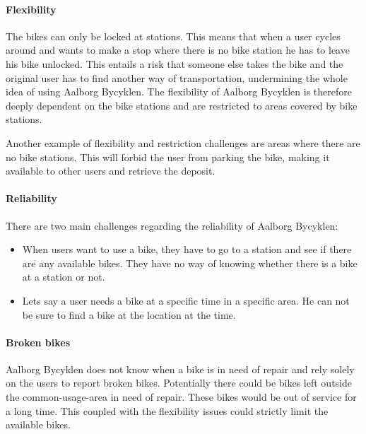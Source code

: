 \paragraph{Flexibility}
The bikes can only be locked at stations.
This means that when a user cycles around and wants to make a stop where there is no bike station he has to leave his bike unlocked.
This entails a risk that someone else takes the bike and the original user has to find another way of transportation, undermining the whole idea of using Aalborg Bycyklen.
The flexibility of Aalborg Bycyklen is therefore deeply dependent on the bike stations and are restricted to areas covered by bike stations.

Another example of flexibility and restriction challenges are areas where there are no bike stations. This will forbid the user from parking the bike, making it available to other users and retrieve the deposit.

\paragraph{Reliability}
There are two main challenges regarding the reliability of Aalborg Bycyklen:
\begin{itemize}
\item When users want to use a bike, they have to go to a station and see if there are any available bikes.
They have no way of knowing whether there is a bike at a station or not.
\item Lets say a user needs a bike at a specific time in a specific area.
He can not be sure to find a bike at the location at the time.
\end{itemize}

\paragraph{Broken bikes}
Aalborg Bycyklen does not know when a bike is in need of repair and rely solely on the users to report broken bikes.
Potentially there could be bikes left outside the common-usage-area in need of repair. These bikes would be out of service for a long time.
This coupled with the flexibility issues could strictly limit the available bikes.